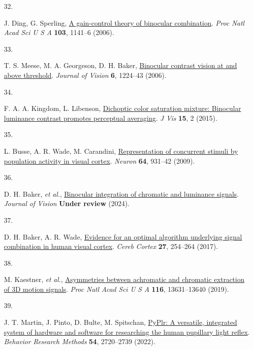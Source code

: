 \documentclass[
]{article}
\newlength{\cslhangindent}
\newlength{\csllabelwidth}
\newlength{\cslentryspacingunit} %
\newenvironment{CSLReferences}[2] %
 {%
  \setlength{\parindent}{0pt}
  \ifodd #1
  \let\oldpar\par
  \def\par{\hangindent=\cslhangindent\oldpar}
  \fi
  \setlength{\parskip}{#2\cslentryspacingunit}
 }%
 {}
\newcommand{\CSLLeftMargin}[1]{\parbox[t]{\csllabelwidth}{#1}}
\newcommand{\CSLRightInline}[1]{\parbox[t]{\linewidth - \csllabelwidth}{#1}\break}
\begin{document}
\begin{CSLReferences}{0}{0}
\leavevmode{}%
\CSLLeftMargin{32. }%
\CSLRightInline{J. Ding, G. Sperling, \href{https://doi.org/10.1073/pnas.0509629103}{A gain-control theory of binocular combination}. \emph{Proc Natl Acad Sci U S A} \textbf{103}, 1141--6 (2006).}

\leavevmode{}%
\CSLLeftMargin{33. }%
\CSLRightInline{T. S. Meese, M. A. Georgeson, D. H. Baker, \href{https://doi.org/10.1167/6.11.7}{Binocular contrast vision at and above threshold}. \emph{Journal of Vision} \textbf{6}, 1224--43 (2006).}

\leavevmode{}%
\CSLLeftMargin{34. }%
\CSLRightInline{F. A. A. Kingdom, L. Libenson, \href{https://doi.org/10.1167/15.5.2}{Dichoptic color saturation mixture: Binocular luminance contrast promotes perceptual averaging}. \emph{J Vis} \textbf{15}, 2 (2015).}

\leavevmode{}%
\CSLLeftMargin{35. }%
\CSLRightInline{L. Busse, A. R. Wade, M. Carandini, \href{https://doi.org/10.1016/j.neuron.2009.11.004}{Representation of concurrent stimuli by population activity in visual cortex}. \emph{Neuron} \textbf{64}, 931--42 (2009).}

\leavevmode{}%
\CSLLeftMargin{36. }%
\CSLRightInline{D. H. Baker, \emph{et al.}, \href{https://doi.org/10.31234/osf.io/atsfh}{Binocular integration of chromatic and luminance signals}. \emph{Journal of Vision} \textbf{Under review} (2024).}

\leavevmode{}%
\CSLLeftMargin{37. }%
\CSLRightInline{D. H. Baker, A. R. Wade, \href{https://doi.org/10.1093/cercor/bhw395}{Evidence for an optimal algorithm underlying signal combination in human visual cortex}. \emph{Cereb Cortex} \textbf{27}, 254--264 (2017).}

\leavevmode{}%
\CSLLeftMargin{38. }%
\CSLRightInline{M. Kaestner, \emph{et al.}, \href{https://doi.org/10.1073/pnas.1817202116}{Asymmetries between achromatic and chromatic extraction of 3D motion signals}. \emph{Proc Natl Acad Sci U S A} \textbf{116}, 13631--13640 (2019).}

\leavevmode{}%
\CSLLeftMargin{39. }%
\CSLRightInline{J. T. Martin, J. Pinto, D. Bulte, M. Spitschan, \href{https://doi.org/10.3758/s13428-021-01759-3}{PyPlr: A versatile, integrated system of hardware and software for researching the human pupillary light reflex}. \emph{Behavior Research Methods} \textbf{54}, 2720--2739 (2022).}


\end{CSLReferences}
\end{document}
